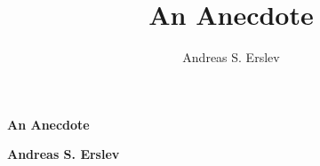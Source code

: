 \documentclass[]{article}
\title{An Anecdote}
\author{Andreas S. Erslev}
\begin{document}
	
	\begin{center}
		\Large\textbf{An Anecdote}
	\end{center}
	
	\begin{center}
		\large\textbf{Andreas S. Erslev}
	\end{center}
	

	
\end{document}
